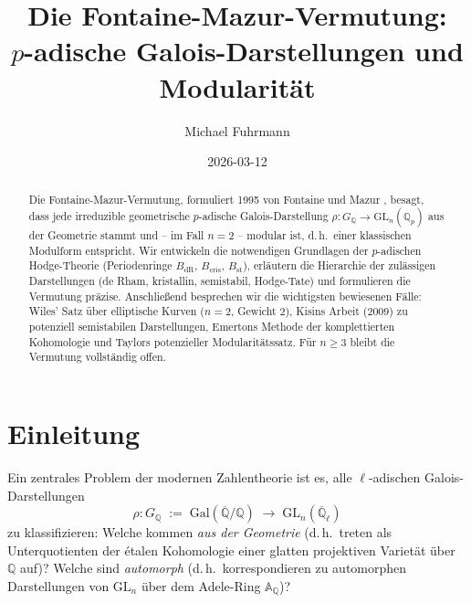 \documentclass[12pt,a4paper]{amsart}
\theoremstyle{definition}
\theoremstyle{remark}
\newcommand{\Gal}{\mathrm{Gal}}
\newcommand{\GL}{\mathrm{GL}}
\newcommand{\Qp}{\mathbb{Q}_p}
\newcommand{\Qbar}{\overline{\mathbb{Q}}}
\newcommand{\GQ}{G_{\mathbb{Q}}}
\newcommand{\BdR}{B_{\mathrm{dR}}}
\newcommand{\Bcris}{B_{\mathrm{cris}}}
\newcommand{\Bst}{B_{\mathrm{st}}}
\newcommand{\Q}{\mathbb{Q}}
\begin{document}

\title{Die Fontaine-Mazur-Vermutung:\\
  $p$-adische Galois-Darstellungen und Modularität}

\author{Michael Fuhrmann}
\address{Specialist Mathematics Project, Build 167}
\date{2026-03-12}

\begin{abstract}
Die Fontaine-Mazur-Vermutung, formuliert 1995 von Fontaine und Mazur \cite{FM1995},
besagt, dass jede irreduzible geometrische $p$-adische Galois-Darstellung
$\rho\colon \GQ \to \GL_n(\Qp)$
aus der Geometrie stammt und -- im Fall $n=2$ -- modular ist, d.\,h.\ einer klassischen
Modulform entspricht.
Wir entwickeln die notwendigen Grundlagen der $p$-adischen Hodge-Theorie (Periodenringe
$\BdR$, $\Bcris$, $\Bst$), erläutern die Hierarchie der zulässigen Darstellungen
(de Rham, kristallin, semistabil, Hodge-Tate) und formulieren die Vermutung präzise.
Anschließend besprechen wir die wichtigsten bewiesenen Fälle:
Wiles' Satz über elliptische Kurven ($n=2$, Gewicht $2$),
Kisins Arbeit (2009) zu potenziell semistabilen Darstellungen,
Emertons Methode der komplettierten Kohomologie und
Taylors potenzieller Modularitätssatz.
Für $n \geq 3$ bleibt die Vermutung vollständig offen.
\end{abstract}

\maketitle

\tableofcontents

\section{Einleitung}

Ein zentrales Problem der modernen Zahlentheorie ist es, alle
$\ell$-adischen Galois-Darstellungen
\[
  \rho \colon \GQ \;:=\; \Gal(\Qbar/\Q) \;\longrightarrow\; \GL_n(\overline{\Q}_\ell)
\]
zu klassifizieren: Welche kommen \emph{aus der Geometrie} (d.\,h.\ treten als
Unterquotienten der étalen Kohomologie einer glatten projektiven Varietät über $\Q$ auf)?
Welche sind \emph{automorph} (d.\,h.\ korrespondieren zu automorphen Darstellungen von
$\GL_n$ über dem Adele-Ring $\mathbb{A}_\Q$)?
\end{document}
